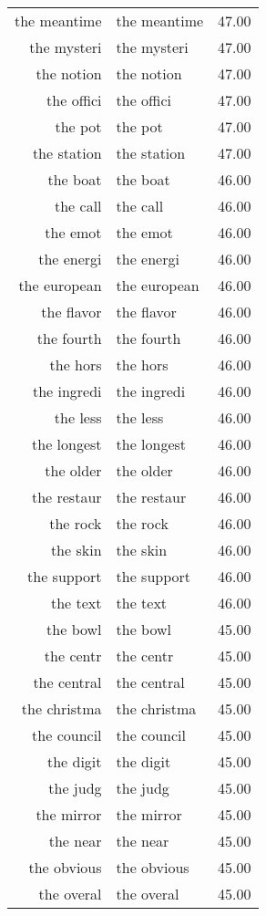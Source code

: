 \begin{table}[ht]
\begin{tabular}{rlr}
  the meantime & the meantime & 47.00 \\ 
  the mysteri & the mysteri & 47.00 \\ 
  the notion & the notion & 47.00 \\ 
  the offici & the offici & 47.00 \\ 
  the pot & the pot & 47.00 \\ 
  the station & the station & 47.00 \\ 
  the boat & the boat & 46.00 \\ 
  the call & the call & 46.00 \\ 
  the emot & the emot & 46.00 \\ 
  the energi & the energi & 46.00 \\ 
  the european & the european & 46.00 \\ 
  the flavor & the flavor & 46.00 \\ 
  the fourth & the fourth & 46.00 \\ 
  the hors & the hors & 46.00 \\ 
  the ingredi & the ingredi & 46.00 \\ 
  the less & the less & 46.00 \\ 
  the longest & the longest & 46.00 \\ 
  the older & the older & 46.00 \\ 
  the restaur & the restaur & 46.00 \\ 
  the rock & the rock & 46.00 \\ 
  the skin & the skin & 46.00 \\ 
  the support & the support & 46.00 \\ 
  the text & the text & 46.00 \\ 
  the bowl & the bowl & 45.00 \\ 
  the centr & the centr & 45.00 \\ 
  the central & the central & 45.00 \\ 
  the christma & the christma & 45.00 \\ 
  the council & the council & 45.00 \\ 
  the digit & the digit & 45.00 \\ 
  the judg & the judg & 45.00 \\ 
  the mirror & the mirror & 45.00 \\ 
  the near & the near & 45.00 \\ 
  the obvious & the obvious & 45.00 \\ 
  the overal & the overal & 45.00 \\ 

\end{tabular}
\end{table}
